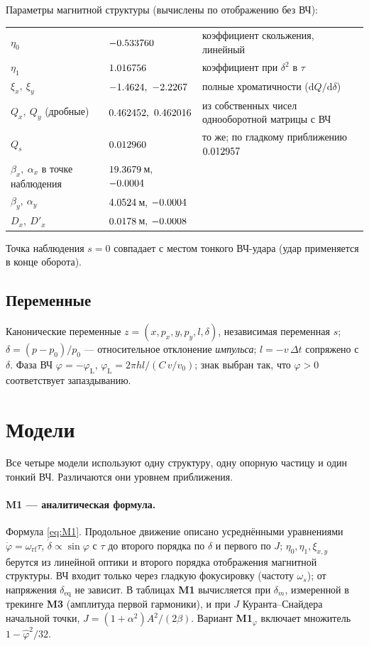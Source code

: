\documentclass[a4paper,11pt]{article}
\newcommand{\deq}{\delta_{\mathrm{eq}}}
\newcommand{\rf}{\mathrm{rf}}
\newcommand{\Mone}{\textbf{M1}}\newcommand{\Mtwo}{\textbf{M2}}
\newcommand{\Mthree}{\textbf{M3}}\newcommand{\Mfour}{\textbf{M4}}
\begin{document}
Параметры магнитной структуры (вычислены по отображению без ВЧ):
\begin{center}
\begin{tabular}{lll}
\toprule
$\eta_0$ & $-0.533760$ & коэффициент скольжения, линейный \\
$\eta_1$ & $1.016756$ & коэффициент при $\delta^2$ в $\tau$ \\
$\xi_x,\ \xi_y$ & $\vxix,\ \vxiy$ & полные хроматичности ($\mathrm{d}Q/\mathrm{d}\delta$) \\
$Q_x,\ Q_y$ (дробные) & $\vQx,\ \vQy$ & из собственных чисел однооборотной матрицы с ВЧ \\
$Q_s$ & $0.012960$ & то же; по гладкому приближению $0.012957$ \\
$\beta_x,\ \alpha_x$ в точке наблюдения & $19.3679$\,м, $-0.0004$ & \\
$\beta_y,\ \alpha_y$ & $4.0524$\,м, $-0.0004$ & \\
$D_x,\ D'_x$ & $0.0178$\,м, $-0.0008$ & \\
\bottomrule
\end{tabular}
\end{center}
Точка наблюдения $s=0$ совпадает с местом тонкого ВЧ-удара (удар применяется в конце оборота).

\subsection{Переменные}
Канонические переменные $z=(x,p_x,y,p_y,l,\delta)$, независимая переменная $s$; $\delta=(p-p_0)/p_0$ --- относительное отклонение \emph{импульса}; $l=-v\,\Delta t$ сопряжено с $\delta$. Фаза ВЧ $\varphi=-\varphi_{\mathrm{L}}$, $\varphi_{\mathrm{L}}=2\pi h l/(C\,v/v_0)$; знак выбран так, что $\varphi>0$ соответствует запаздыванию.

\section{Модели}\label{sec:models}
Все четыре модели используют одну структуру, одну опорную частицу и один тонкий ВЧ. Различаются они уровнем приближения.

\paragraph{\Mone{} --- аналитическая формула.}
Формула \eqref{eq:M1}. Продольное движение описано усреднёнными уравнениями $\dot\varphi=\omega_\rf\tau$, $\dot\delta\propto\sin\varphi$ с $\tau$ до второго порядка по $\delta$ и первого по $J$; $\eta_0,\eta_1,\xi_{x,y}$ берутся из линейной оптики и второго порядка отображения магнитной структуры. ВЧ входит только через гладкую фокусировку (частоту $\omega_s$); от напряжения $\deq$ не зависит. В таблицах \Mone{} вычисляется при $\delta_m$, измеренной в трекинге \Mthree{} (амплитуда первой гармоники), и при $J$ Куранта--Снайдера начальной точки, $J=(1+\alpha^2)A^2/(2\beta)$. Вариант \Mone$_\varphi$ включает множитель $1-\hat\varphi^2/32$.
\end{document}
